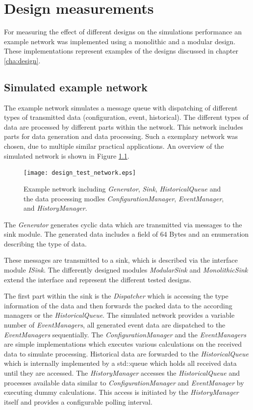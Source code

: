 \chapter{Design measurements}
\label{cha:measurements}
For measuring the effect of different designs on the simulations performance an example network was implemented using a monolithic and a modular design.
These implementations represent examples of the designs discussed in chapter \ref{cha:design}.


\section{Simulated example network}
\label{sec:measurements_network}
The example network simulates a message queue with dispatching of different types of transmitted data (configuration, event, historical).
The different types of data are processed by different parts within the network.
This network includes parts for data generation and data processing.
Such a exemplary network was chosen, due to multiple similar practical applications.
An overview of the simulated network is shown in Figure \ref{fig:design_test_network}.

\begin{figure}
    \centering
    \texttt{[image: design\_test\_network.eps]}
    \caption{Example network including \emph{Generator}, \emph{Sink}, \emph{HistoricalQueue} and the data processing modles \emph{ConfigurationManager}, \emph{EventManager}, and \emph{HistoryManager}.}
    \label{fig:design_test_network}
\end{figure}

The \emph{Generator} generates cyclic data which are transmitted via messages to the sink module.
The generated data includes a field of 64 Bytes and an enumeration describing the type of data.

These messages are transmitted to a sink, which is described via the interface module \emph{ISink}.
The differently designed modules \emph{ModularSink} and \emph{MonolithicSink} extend the interface and represent the different tested designs.

The first part within the sink is the \emph{Dispatcher} which is accessing the type information of the data and then forwards the packed data to the according managers or the \emph{HistoricalQueue}.
The simulated network provides a variable number of \emph{EventManagers}, all generated event data are dispatched to the \emph{EventManagers} sequentially.
The \emph{ConfigurationManager} and the \emph{EventManagers} are simple implementations which executes various calculations on the received data to simulate processing.
Historical data are forwarded to the \emph{HistoricalQueue} which is internally implemented by a std::queue which holds all received data until they are accessed.
The \emph{HistoryManager} accesses the \emph{HistoricalQueue} and processes available data similar to \emph{ConfigurationManager} and \emph{EventManager} by executing dummy calculations.
This access is initiated by the \emph{HistoryManager} itself and provides a configurable polling interval.
\\

